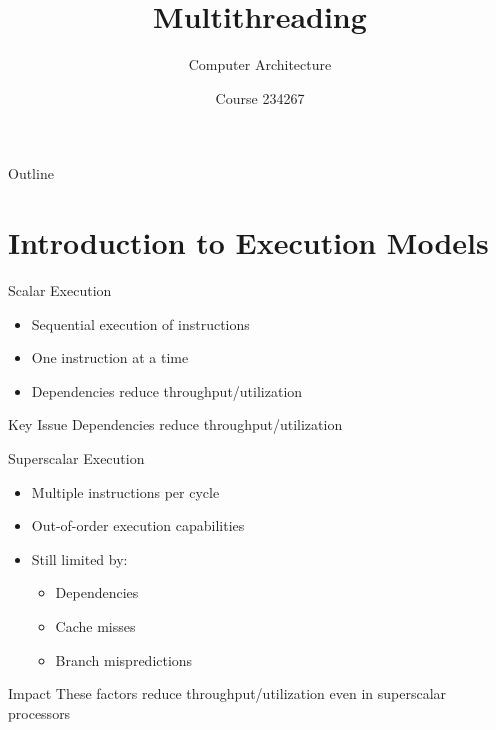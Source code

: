 \documentclass[aspectratio=169,12pt]{beamer}
\title{Multithreading}
\subtitle{Computer Architecture}
\author{Course 234267}
\date{}
\begin{document}
\frame{\titlepage}

\begin{frame}{Outline}
\tableofcontents
\end{frame}

\section{Introduction to Execution Models}

\begin{frame}{Scalar Execution}
\begin{itemize}
    \item Sequential execution of instructions
    \item One instruction at a time
    \item Dependencies reduce throughput/utilization
\end{itemize}

\vspace{0.5cm}
\begin{center}
\end{center}

\begin{alertblock}{Key Issue}
Dependencies reduce throughput/utilization
\end{alertblock}
\end{frame}

\begin{frame}{Superscalar Execution}
\begin{itemize}
    \item Multiple instructions per cycle
    \item Out-of-order execution capabilities
    \item Still limited by:
    \begin{itemize}
        \item Dependencies
        \item Cache misses
        \item Branch mispredictions
    \end{itemize}
\end{itemize}

\begin{block}{Impact}
These factors reduce throughput/utilization even in superscalar processors
\end{block}
\end{frame}
\end{document}

